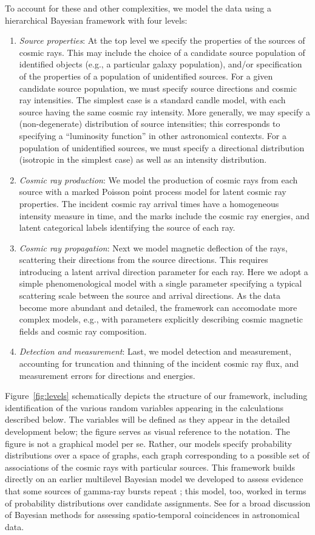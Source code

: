 To account for these and other complexities, we model the data using a
hierarchical Bayesian framework with four levels:
\begin{enumerate}
\item {\em Source properties}:  At the top level we specify the properties
of the sources of cosmic rays.  This may include the choice of a candidate
source population of identified objects (e.g., a particular galaxy
population), and/or specification of the properties of a population of
unidentified sources.  For a given candidate source population, we must
specify source directions and cosmic ray intensities.  The simplest case is
a standard candle model, with each source having the same cosmic ray
intensity.  More generally, we may specify a (non-degenerate) distribution
of source intensities; this corresponds to specifying a ``luminosity
function'' in other astronomical contexts.  For a population of unidentified
sources, we must specify a directional distribution (isotropic in the
simplest case) as well as an intensity distribution.
\item {\em Cosmic ray production}:  We model the production of cosmic rays
from each source with a marked Poisson point process model for latent cosmic
ray properties.  The incident cosmic ray arrival times have a homogeneous
intensity measure in time, and the marks include the cosmic ray energies,
and latent categorical labels identifying the source of each ray.
\item {\em Cosmic ray propagation}:  Next we model magnetic deflection of
the rays, scattering their directions from the source directions.  
This requires introducing a latent arrival direction parameter for each ray.
Here we adopt a simple phenomenological model with a single parameter
specifying a typical scattering scale between the source and arrival
directions.  As the data become more abundant and detailed, the framework
can accomodate more complex models, e.g., with parameters explicitly
describing cosmic magnetic fields and cosmic ray composition.
\item {\em Detection and measurement}:  Last, we model detection and
measurement, accounting for truncation and thinning of the incident
cosmic ray flux, and measurement errors for directions and energies.
\end{enumerate}

Figure~\ref{fig:levels} schematically depicts the structure of our
framework, including identification of the various random variables
appearing in the calculations described below.  The variables will be
defined as they appear in the detailed development below; the figure serves
as visual reference to the notation.  The figure is not a graphical model
per se.  Rather, our models specify probability distributions over a space
of graphs, each graph corresponding to a possible set of associations of the
cosmic rays with particular sources.  This framework builds directly on an
earlier multilevel Bayesian model we developed to assess evidence that some
sources of gamma-ray bursts repeat \cite{LLW96}; this model, too, worked in
terms of probability distributions over candidate assignments.  See
\cite{Loredo12-Coinc} for a broad discussion of Bayesian methods for
assessing spatio-temporal coincidences in astronomical data.

